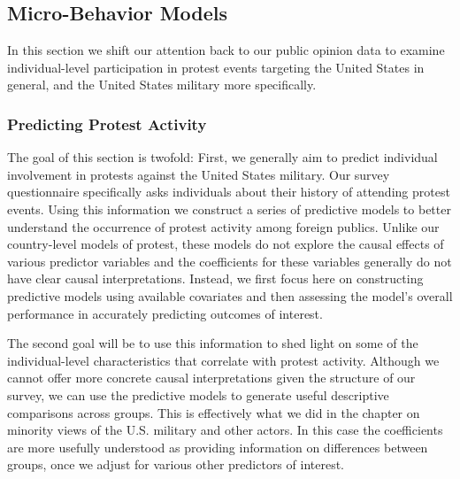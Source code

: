 
\subsection*{Micro-Behavior Models}


In this section we shift our attention back to our public opinion data to examine individual-level participation in protest events targeting the United States in general, and the United States military more specifically. 



\subsubsection*{Predicting Protest Activity}

The goal of this section  is twofold: First, we generally aim to predict individual involvement in protests against the United States military. Our survey questionnaire specifically asks individuals about their history of attending protest events. Using this information we construct a series of predictive models to better understand the occurrence of protest activity among foreign publics. Unlike our country-level models of protest, these models do not explore the causal effects of various predictor variables and the coefficients for these variables generally do not have clear causal interpretations. Instead, we first focus here on constructing predictive models using available covariates and then assessing the model's overall performance in accurately predicting outcomes of interest. 

The second goal will be to use this information to shed light on some of the individual-level characteristics that correlate with protest activity. Although we cannot offer more concrete causal interpretations given the structure of our survey, we can use the predictive models to generate useful descriptive comparisons across groups. This is effectively what we did in the chapter on minority views of the U.S. military and other actors. In this case the coefficients are more usefully understood as providing information on differences between groups, once we adjust for various other predictors of interest.

